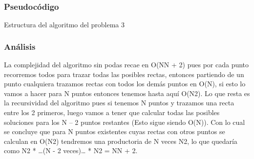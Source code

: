 \newpage
\subsubsection{Pseudocódigo}

\begin{algorithm}[h!]
\caption{Estructura del algoritmo del problema 3}
\begin{algorithmic}[1]
		\EndIf
	\EndFor
	\Else
				\EndIf
							\EndIf
						\EndFor
							\EndIf
						\EndFor
					\EndIf
				\EndIf
			\EndFor
		\EndFor
	\EndIf
	\EndFunction
\end{algorithmic}
\end{algorithm}


\subsubsection{Análisis}

La complejidad del algoritmo sin podas recae en O(NN + 2) pues por cada punto recorremos todos para trazar todas las posibles rectas, entonces partiendo de un punto cualquiera trazamos rectas con todos los demás puntos en O(N), si esto lo vamos a hacer para N puntos entonces tenemos hasta aquí O(N2). Lo que resta es la recursividad del algoritmo pues si tenemos N puntos y trazamos una recta entre los 2 primeros, luego vamos a tener que calcular todas las posibles soluciones para los N – 2 puntos restantes (Esto sigue siendo O(N)). Con lo cual se concluye que para N puntos existentes cuyas rectas con otros puntos se calculan en O(N2) tendremos una productoria de N veces N2, lo que quedaría como N2 * …(N - 2 veces)… * N2 = NN + 2.
